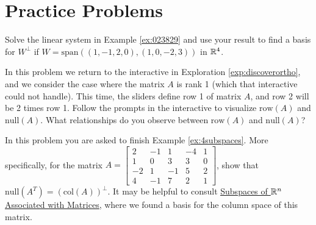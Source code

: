 \documentclass{ximera}
\begin{document}
\section*{Practice Problems}
\begin{problem}\label{prob:Uperp}
Solve the linear system in Example \ref{ex:023829} and use your result to find a basis for $W^\perp$ if $W = \mbox{span}\left((1, -1, 2, 0), (1, 0, -2, 3)\right)$ in $\mathbb{R}^4$.
\end{problem}

\begin{problem}\label{prob:brokenInteractive}
In this problem we return to the interactive in Exploration \ref{exp:discoverortho}, and we consider the case where the matrix $A$ is rank 1 (which that interactive could not handle).  This time, the sliders define row 1 of matrix $A$, and row 2 will be 2 times row 1.  Follow the prompts in the interactive to visualize $\mbox{row}(A)$ and $\mbox{null}(A)$.  What relationships do you observe between $\mbox{row}(A)$ and $\mbox{null}(A)$?

    \begin{center}
\end{center}

\end{problem}

\begin{problem}\label{prob:finishex4subspaces}
In this problem you are asked to finish Example \ref{ex:4subspaces}.  More specifically, for the matrix $A=\begin{bmatrix}2&-1&1&-4&1\\1&0&3&3&0\\-2&1&-1&5&2\\4&-1&7&2&1\end{bmatrix}$, show that $\mbox{null}(A^T) = (\mbox{col}(A))^\perp$.  It may be helpful to consult \href{https://ximera.osu.edu/oerlinalg/LinearAlgebra/VSP-0040/main}{\underline{Subspaces of $\mathbb{R}^n$ Associated with Matrices}}, where we found a basis for the column space of this matrix.
\end{problem}
\end{document}
